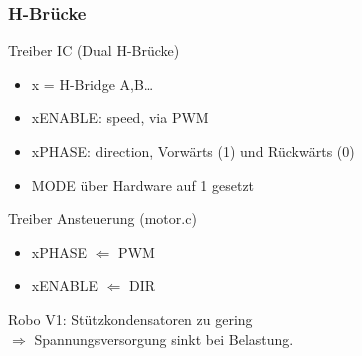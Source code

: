 \documentclass[usenames, dvipsnames]{beamer}
\begin{document}
\begin{frame}
	\frametitle{H-Brücke}

	\begin{block}{Treiber IC (Dual H-Brücke) }
		\begin{itemize}
			\item{x = H-Bridge A,B\dots}
			\item{xENABLE: speed, via PWM}
			\item{xPHASE: direction, Vorwärts (1) und Rückwärts (0)}
			\item{MODE über Hardware auf 1 gesetzt}
		\end{itemize}
	\end{block}


	\begin{block}{Treiber Ansteuerung (motor.c)}
		 \begin{itemize}
	 		\item{xPHASE $\Leftarrow$ PWM}
	 		\item{xENABLE $\Leftarrow$ DIR}
		 \end{itemize}
	\end{block}


	\begin{alertblock}{}
		Robo V1: Stützkondensatoren zu gering\\
		$\Rightarrow$ Spannungsversorgung sinkt bei Belastung.
	\end{alertblock}
\end{frame}
\end{document}
